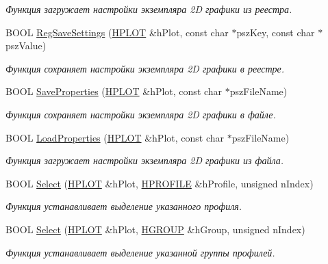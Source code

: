 \begin{DoxyCompactItemize}
\begin{DoxyCompactList}\small\item\em Функция загружает настройки экземпляра 2\-D графики из реестра. \end{DoxyCompactList}\item 
B\-O\-O\-L \hyperlink{group__gr_properties_ga07f14ff8585116fcf19f7421a0c9e64f}{Reg\-Save\-Settings} (\hyperlink{classxyplot_1_1_h_p_l_o_t}{H\-P\-L\-O\-T} \&h\-Plot, const char $\ast$psz\-Key, const char $\ast$psz\-Value)
\begin{DoxyCompactList}\small\item\em Функция сохраняет настройки экземпляра 2\-D графики в реестре. \end{DoxyCompactList}\item 
B\-O\-O\-L \hyperlink{group__gr_properties_gaa8c0d039a585af0356d553ba7a76f152}{Save\-Properties} (\hyperlink{classxyplot_1_1_h_p_l_o_t}{H\-P\-L\-O\-T} \&h\-Plot, const char $\ast$psz\-File\-Name)
\begin{DoxyCompactList}\small\item\em Функция сохраняет настройки экземпляра 2\-D графики в файле. \end{DoxyCompactList}\item 
B\-O\-O\-L \hyperlink{group__gr_properties_ga569a657dccc96f9087dde44794712848}{Load\-Properties} (\hyperlink{classxyplot_1_1_h_p_l_o_t}{H\-P\-L\-O\-T} \&h\-Plot, const char $\ast$psz\-File\-Name)
\begin{DoxyCompactList}\small\item\em Функция загружает настройки экземпляра 2\-D графики из файла. \end{DoxyCompactList}\item 
B\-O\-O\-L \hyperlink{group__gr_select_ga7851d700a43f68d0738617ee01afdd73}{Select} (\hyperlink{classxyplot_1_1_h_p_l_o_t}{H\-P\-L\-O\-T} \&h\-Plot, \hyperlink{classxyplot_1_1_h_p_r_o_f_i_l_e}{H\-P\-R\-O\-F\-I\-L\-E} \&h\-Profile, unsigned n\-Index)
\begin{DoxyCompactList}\small\item\em Функция устанавливает выделение указанного профиля. \end{DoxyCompactList}\item 
B\-O\-O\-L \hyperlink{group__gr_select_ga155570b64a87c676f3cf023ad8ed42a1}{Select} (\hyperlink{classxyplot_1_1_h_p_l_o_t}{H\-P\-L\-O\-T} \&h\-Plot, \hyperlink{classxyplot_1_1_h_g_r_o_u_p}{H\-G\-R\-O\-U\-P} \&h\-Group, unsigned n\-Index)
\begin{DoxyCompactList}\small\item\em Функция устанавливает выделение указанной группы профилей. \end{DoxyCompactList}\item 

\end{DoxyCompactItemize}
